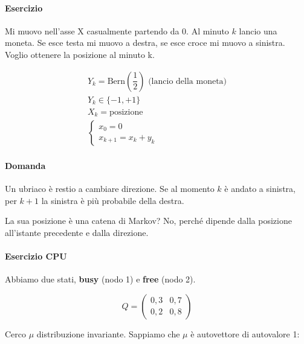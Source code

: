 \paragraph{Esercizio}

Mi muovo nell'asse X casualmente partendo da 0. Al minuto $ k $ lancio una moneta. Se esce testa mi muovo a destra, se esce croce mi muovo a sinistra. Voglio ottenere la posizione al minuto k.

\[ \begin{aligned}
Y_k = \text{Bern}\left(\dfrac{1}{2}\right) \text{ (lancio della moneta)}\\
Y_k \in \{-1, +1\} \\
X_k = \text{posizione} \\
\begin{cases}
	x_0 = 0 \\
	x_{k+1} = x_k + y_k
\end{cases}
\end{aligned} \]


\paragraph{Domanda}
Un ubriaco è restio a cambiare direzione.
Se al momento $ k $ è andato a sinistra, per $ k+1 $ la sinistra è più probabile della destra.

La sua posizione è una catena di Markov? No, perché dipende dalla posizione all'istante precedente e dalla direzione.

\paragraph{Esercizio CPU}

Abbiamo due stati, \textbf{busy} (nodo 1) e \textbf{free} (nodo 2).

\[ Q = \begin{pmatrix}
0,3 & 0,7 \\
0,2 & 0,8
\end{pmatrix} \]

Cerco $ \mu $ distribuzione invariante. Sappiamo che $ \mu $ è autovettore di autovalore 1:

